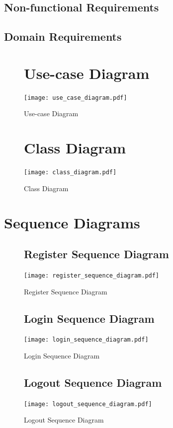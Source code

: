 \documentclass[12pt]{article}
\begin{document}
\subsection{Non-functional Requirements}

\subsection{Domain Requirements}

\begin{figure}[p!]
  \section{Use-case Diagram}
  \centering
  \texttt{[image: use\_case\_diagram.pdf]}
  \caption{Use-case Diagram}
\end{figure}

\clearpage

\begin{figure}[p!]
  \section{Class Diagram}
  \centering
  \texttt{[image: class\_diagram.pdf]}
  \caption{Class Diagram}
\end{figure}

\clearpage

\section{Sequence Diagrams}
\begin{figure}[p!]
  \subsection{Register Sequence Diagram}
  \centering
  \texttt{[image: register\_sequence\_diagram.pdf]}
  \caption{Register Sequence Diagram}
\end{figure}

\begin{figure}[p!]
  \subsection{Login Sequence Diagram}
  \centering
  \texttt{[image: login\_sequence\_diagram.pdf]}
  \caption{Login Sequence Diagram}
\end{figure}

\begin{figure}[p!]
  \subsection{Logout Sequence Diagram}
  \centering
  \texttt{[image: logout\_sequence\_diagram.pdf]}
  \caption{Logout Sequence Diagram}
\end{figure}
\end{document}
